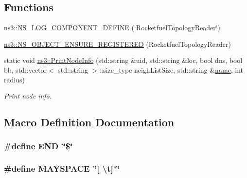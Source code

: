 \subsection*{Functions}
\begin{DoxyCompactItemize}
\item 
\hyperlink{namespacens3_a3852bfe2b76caf97d8b9c5ae3ce2c5ee}{ns3\+::\+N\+S\+\_\+\+L\+O\+G\+\_\+\+C\+O\+M\+P\+O\+N\+E\+N\+T\+\_\+\+D\+E\+F\+I\+NE} (\char`\"{}Rocketfuel\+Topology\+Reader\char`\"{})
\item 
\hyperlink{namespacens3_a80871af00fd7dabca3a417bd49a9ad9d}{ns3\+::\+N\+S\+\_\+\+O\+B\+J\+E\+C\+T\+\_\+\+E\+N\+S\+U\+R\+E\+\_\+\+R\+E\+G\+I\+S\+T\+E\+R\+ED} (Rocketfuel\+Topology\+Reader)
\item 
static void \hyperlink{namespacens3_a6751b8bdf2791ff6f387d4f0447ff9f3}{ns3\+::\+Print\+Node\+Info} (std\+::string \&uid, std\+::string \&loc, bool dns, bool bb, std\+::vector$<$ std\+::string $>$\+::size\+\_\+type neigh\+List\+Size, std\+::string \&\hyperlink{generate__test__data__lte__spectrum__model_8m_ab74e6bf80237ddc4109968cedc58c151}{name}, int radius)
\begin{DoxyCompactList}\small\item\em Print node info. \end{DoxyCompactList}\end{DoxyCompactItemize}


\subsection{Macro Definition Documentation}
\subsubsection[{\texorpdfstring{E\+ND}{END}}]{\setlength{\rightskip}{0pt plus 5cm}\#define E\+ND~\char`\"{}\$\char`\"{}}\hypertarget{rocketfuel-topology-reader_8cc_a29fd18bed01c4d836c7ebfe73a125c3f}{}\label{rocketfuel-topology-reader_8cc_a29fd18bed01c4d836c7ebfe73a125c3f}
\subsubsection[{\texorpdfstring{M\+A\+Y\+S\+P\+A\+CE}{MAYSPACE}}]{\setlength{\rightskip}{0pt plus 5cm}\#define M\+A\+Y\+S\+P\+A\+CE~\char`\"{}\mbox{[} \textbackslash{}t\mbox{]}$\ast$\char`\"{}}\hypertarget{rocketfuel-topology-reader_8cc_a35748b428d56da2e93f4f4c9d0cba87c}{}\label{rocketfuel-topology-reader_8cc_a35748b428d56da2e93f4f4c9d0cba87c}
